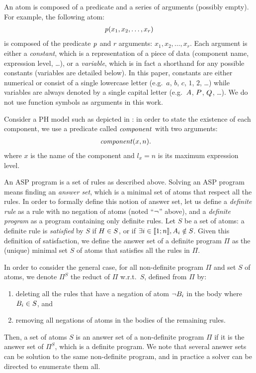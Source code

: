 An atom is composed of a predicate and a series of arguments (possibly empty).
For example, the following atom:
\begin{align*}
  \mathit{p}(x_1, x_2, \dots, x_r)
\end{align*}
is composed of the predicate $\mathit{p}$ and $r$ arguments: $x_1, x_2, \dots, x_r$.
Each argument is either a \emph{constant}, which is a representation of a piece of data (component name, expression level, …),
or a \emph{variable}, which is in fact a shorthand for any possible constants (variables are detailed below).
In this paper, constants are either numerical or consist of a single lowercase letter (e.g.~$a$, $b$, $c$, $1$, $2$, …)
while variables are always denoted by a single capital letter (e.g.~$A$, $P$, $Q$, …).
We do not use function symbols as arguments in this work.

\begin{example}\label{ex:asp-atom}
Consider a PH model such as depicted in :
in order to state the existence of each component, we use a predicate called $\mathit{component}$ with two arguments:
\begin{align*}
  &\mathit{component}(x, n).
\end{align*}
where $x$ is the name of the component and $l_x = n$ is its maximum expression level.
\end{example}

An ASP program is a set of rules as described above.
Solving an ASP program means finding an \emph{answer set}, which is a minimal set of atoms that respect all the rules.
In order to formally define this notion of answer set,
let us define a \emph{definite rule} as a rule with no negation of atoms (noted “$\neg$” above),
and a \emph{definite program} as a program containing only definite rules.
Let $S$ be a set of atoms: a definite rule is \emph{satisfied} by $S$ if $H \in S$,
or if $\exists i \in \llbracket 1 ; n \rrbracket, A_i \notin S$.
Given this definition of satisfaction, we define the answer set of a definite program $\Pi$
as the (unique) minimal set $S$ of atoms that satisfies all the rules in $\Pi$.

In order to consider the general case,
for all non-definite program $\Pi$ and set $S$ of atoms, we denote $\Pi^S$ the reduct of $\Pi$ w.r.t.~$S$, defined from $\Pi$ by:
\begin{enumerate}
  \item deleting all the rules that have a negation of atom $\neg B_i$ in the body where $B_i \in S$, and
  \item removing all negations of atoms in the bodies of the remaining rules.
\end{enumerate}
Then, a set of atoms $S$ is an answer set of a non-definite program $\Pi$ if it is the answer set of $\Pi^S$, which is a definite program.
We note that several answer sets can be solution to the same non-definite program, and in practice a solver can be directed to enumerate them all.

